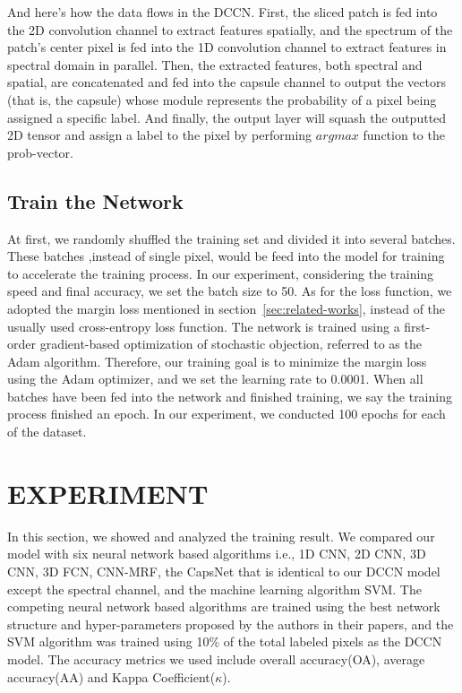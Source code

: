 \documentclass{article}
\begin{document}
	And here's how the data flows in the DCCN.
	First, the sliced patch is fed into the 2D convolution channel to extract features spatially, and the spectrum
	of the patch's center pixel is fed into the 1D convolution channel to extract features in spectral domain in
	parallel.
	Then, the extracted features, both spectral and spatial, are concatenated and fed into the capsule channel to output
	the vectors (that is, the capsule) whose module represents the probability of a pixel being assigned a specific
	label.
	And finally, the output layer will squash the outputted 2D tensor and assign a label to the pixel by performing
	$argmax$ function to the prob-vector.

	\subsection{Train the Network}\label{subsec:train-the-network}
	At first, we randomly shuffled the training set and divided it into several batches.
	These batches ,instead of single pixel, would be feed into the model for training to accelerate the training process.
	In our experiment, considering the training speed and final accuracy, we set the batch size to 50.
	As for the loss function, we adopted the margin loss mentioned in section~\ref{sec:related-works}, instead of the
	usually used cross-entropy loss function.
	The network is trained using a first-order gradient-based optimization of stochastic objection, referred to as the
	Adam algorithm.
	Therefore, our training goal is to minimize the margin loss using the Adam optimizer, and we set the learning rate
	to 0.0001.
	When all batches have been fed into the network and finished training, we say the training process finished an epoch.
	In our experiment, we conducted 100 epochs for each of the dataset.



	\section{EXPERIMENT}\label{sec:experiment}
	In this section, we showed and analyzed the training result.
	We compared our model with six neural network based algorithms i.e.,
	1D CNN\cite{hu2015deep},
	2D CNN\cite{sharma2016hyperspectral},
	3D CNN\cite{hamida20183},
	3D FCN\cite{lee2016contextual},
	CNN-MRF\cite{cao2018hyperspectral},
	the CapsNet that is identical to our DCCN model except the spectral channel, and the machine learning algorithm
	SVM\@.
	The competing neural network based algorithms are trained using the best network structure and hyper-parameters
	proposed by the authors in their papers, and the SVM algorithm was trained using 10\% of the total labeled pixels
	as the DCCN model.
	The accuracy metrics we used include overall accuracy(OA), average accuracy(AA) and Kappa Coefficient($\kappa$).
\end{document}
